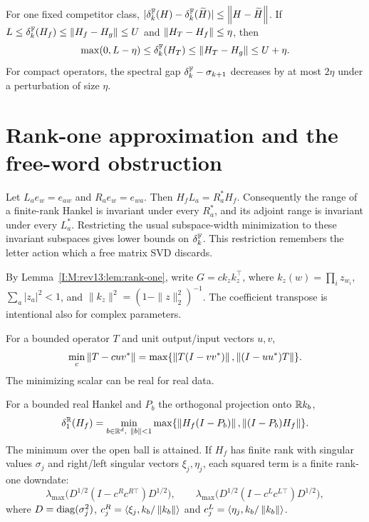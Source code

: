 \begin{proposition}\label{I:S:prop:transfer}
For one fixed competitor class, $|\delta_{k}^{\mathbb F}(H)-\delta_{k}^{\mathbb F}(\widetilde H)|\le\left\lVert H-\widetilde H\right\rVert$. If $L\le\delta_{k}^{\mathbb F}(H_f)\le\left\lVert H_f-H_g\right\rVert\le U$ and $\left\lVert H_T-H_f\right\rVert\le\eta$, then
\[
 \max(0,L-\eta)\le\delta_{k}^{\mathbb F}(H_T)\le\left\lVert H_T-H_g\right\rVert\le U+\eta.
\]
For compact operators, the spectral gap $\delta_{k}^{\mathbb F}-\sigma_{k+1}$ decreases by at most $2\eta$ under a perturbation of size $\eta$.
\end{proposition}


\section{Rank-one approximation and the free-word obstruction}\label{I:S:sec:rankone}
Let $L_a e_w=e_{aw}$ and $R_a e_w=e_{wa}$. Then $H_f L_a=R_a^*H_f$. Consequently the range of a finite-rank Hankel is invariant under every $R_a^*$, and its adjoint range is invariant under every $L_a^*$. Restricting the usual subspace-width minimization to these invariant subspaces gives lower bounds on $\delta_{k}^{\mathbb F}$. This restriction remembers the letter action which a free matrix SVD discards.

By Lemma~\ref{I:M:rev13:lem:rank-one}, write $G=c k_zk_z^\top$,
where $k_z(w)=\prod_i z_{w_i}$, $\sum_a|z_a|^2<1$, and
$\|k_z\|^2=(1-\|z\|_2^2)^{-1}$. The coefficient transpose is
intentional also for complex parameters.

\begin{lemma}\label{I:S:lem:corner}
For a bounded operator $T$ and unit output/input vectors $u,v$,
\[
 \min_c\left\lVert T-cuv^*\right\rVert
   =\max\{\left\lVert T(I-vv^*)\right\rVert,\left\lVert(I-uu^*)T\right\rVert\}.
\]
The minimizing scalar can be real for real data.
\end{lemma}


\begin{theorem}\label{I:S:thm:rankone}
For a bounded real Hankel and $P_b$ the orthogonal projection onto $\mathbb R k_b$,
\[
 \delta_1^\mathbb R(H_f)=\min_{b\in\mathbb R^d,\ \left\lVert b\right\rVert<1}
 \max\{\left\lVert H_f(I-P_b)\right\rVert,\left\lVert(I-P_b)H_f\right\rVert\}.
\]
The minimum over the open ball is attained. If $H_f$ has finite rank with singular values $\sigma_j$ and right/left singular vectors $\xi_j,\eta_j$, each squared term is a finite rank-one downdate:
\[
 \lambda_{\max}\bigl(D^{1/2}(I-c^Rc^{R\top})D^{1/2}\bigr),\qquad
 \lambda_{\max}\bigl(D^{1/2}(I-c^Lc^{L\top})D^{1/2}\bigr),
\]
where $D=\operatorname{diag}(\sigma_j^2)$, $c^R_j=\left\langle\xi_j,k_b/\left\lVert k_b\right\rVert\right\rangle$ and $c^L_j=\left\langle\eta_j,k_b/\left\lVert k_b\right\rVert\right\rangle$.
\end{theorem}


